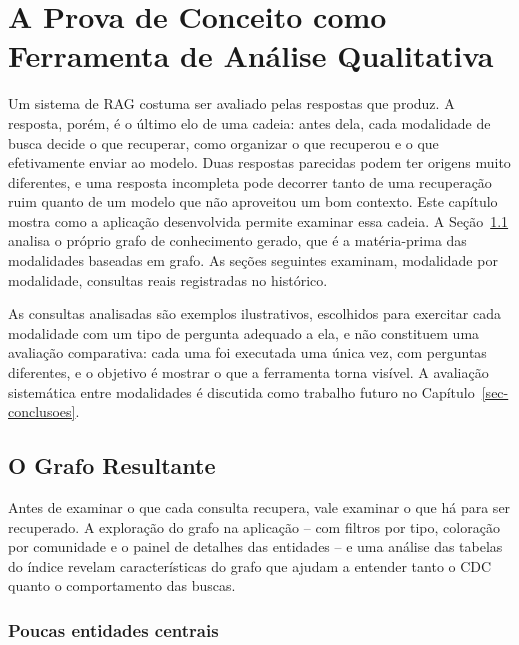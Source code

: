 \chapter{A Prova de Conceito como Ferramenta de Análise Qualitativa}
\label{sec-analise}

Um sistema de RAG costuma ser avaliado pelas respostas que produz. A resposta, porém, é o último elo de uma cadeia: antes dela, cada modalidade de busca decide o que recuperar, como organizar o que recuperou e o que efetivamente enviar ao modelo. Duas respostas parecidas podem ter origens muito diferentes, e uma resposta incompleta pode decorrer tanto de uma recuperação ruim quanto de um modelo que não aproveitou um bom contexto. Este capítulo mostra como a aplicação desenvolvida permite examinar essa cadeia. A Seção~\ref{sec-analise-grafo} analisa o próprio grafo de conhecimento gerado, que é a matéria-prima das modalidades baseadas em grafo. As seções seguintes examinam, modalidade por modalidade, consultas reais registradas no histórico.

As consultas analisadas são exemplos ilustrativos, escolhidos para exercitar cada modalidade com um tipo de pergunta adequado a ela, e não constituem uma avaliação comparativa: cada uma foi executada uma única vez, com perguntas diferentes, e o objetivo é mostrar o que a ferramenta torna visível. A avaliação sistemática entre modalidades é discutida como trabalho futuro no Capítulo~\ref{sec-conclusoes}.

\section{O Grafo Resultante}
\label{sec-analise-grafo}

Antes de examinar o que cada consulta recupera, vale examinar o que há para ser recuperado. A exploração do grafo na aplicação -- com filtros por tipo, coloração por comunidade e o painel de detalhes das entidades -- e uma análise das tabelas do índice revelam características do grafo que ajudam a entender tanto o CDC quanto o comportamento das buscas.

\subsection{Poucas entidades centrais}
\label{sec-analise-grafo-centrais}


